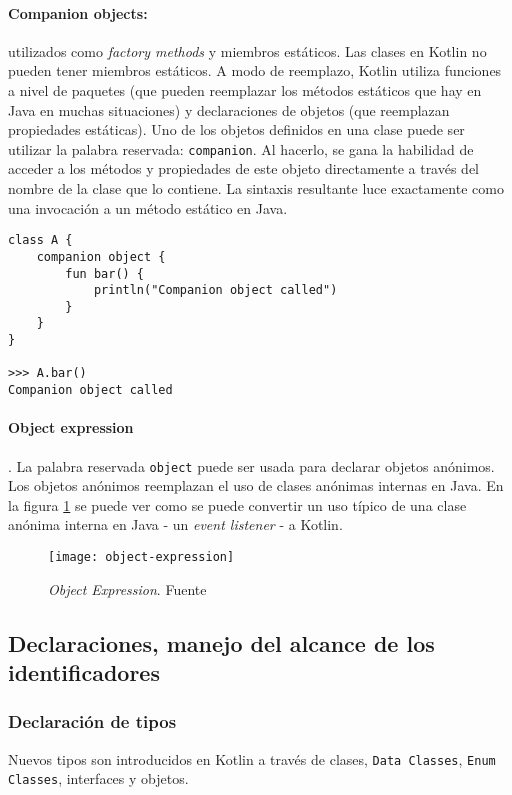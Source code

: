 \paragraph{Companion objects:} utilizados como \emph{factory methods} y miembros estáticos. Las clases en Kotlin no pueden tener miembros estáticos. A modo de reemplazo, Kotlin utiliza funciones a nivel de paquetes (que pueden reemplazar los métodos estáticos que hay en Java en muchas situaciones) y declaraciones de objetos (que reemplazan propiedades estáticas). Uno de los objetos definidos en una clase puede ser utilizar la palabra reservada: \texttt{companion}. Al hacerlo, se gana la habilidad de acceder a los métodos y propiedades de este objeto directamente a través del nombre de la clase que lo contiene. La sintaxis resultante luce exactamente como una invocación a un método estático en Java.

\begin{verbatim}
class A {
    companion object {
        fun bar() {
            println("Companion object called")
        }
    }
}

>>> A.bar()
Companion object called
\end{verbatim}

\paragraph{Object expression}. La palabra reservada \texttt{object} puede ser usada para declarar objetos anónimos. Los objetos anónimos reemplazan el uso de clases anónimas internas en Java. En la figura \ref{fig:object-expression} se puede ver como se puede convertir un uso típico de una clase anónima interna en Java - un \emph{event listener} - a Kotlin.

\begin{figure}[h!]
  \texttt{[image: object-expression]}
  \caption{\emph{Object Expression}. Fuente \cite{kotlin-in-action}}
  \label{fig:object-expression}
\end{figure} 

\subsection{Declaraciones, manejo del alcance de los identificadores} \label{sec:declaraciones}

\subsubsection{Declaración de tipos}
Nuevos tipos son introducidos en Kotlin a través de clases, \texttt{Data Classes}, \texttt{Enum Classes}, interfaces y objetos.

